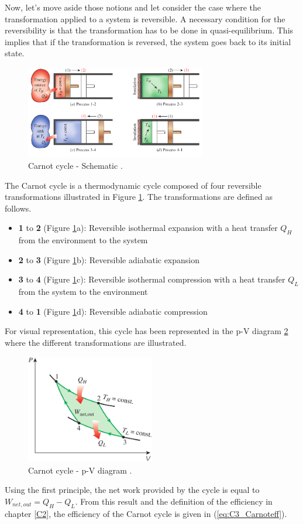 Now, let’s move aside those notions and let consider the case where the transformation applied to a system is reversible. A necessary condition for the reversibility is that the transformation has to be done in quasi-equilibrium. This implies that if the transformation is reversed, the system goes back to its initial state.

\begin{figure}[h]
\centering
\includegraphics[width=0.7\textwidth]{Carnot_schema.png}
\caption{Carnot cycle - Schematic \cite{2015}.}
\label{fig:C3_Carnot}
\end{figure}

The Carnot cycle is a thermodynamic cycle composed of four reversible transformations illustrated in Figure \ref{fig:C3_Carnot}. The transformations are defined as follows.

\begin{itemize}
\item \textbf{1} to \textbf{2} (Figure \ref{fig:C3_Carnot}a): Reversible isothermal expansion with a heat transfer $Q_H$ from the environment to the system
\item \textbf{2} to \textbf{3} (Figure \ref{fig:C3_Carnot}b): Reversible  adiabatic expansion
\item \textbf{3} to \textbf{4} (Figure \ref{fig:C3_Carnot}c): Reversible isothermal compression with a heat transfer $Q_L$ from the system to the environment
\item \textbf{4} to \textbf{1} (Figure \ref{fig:C3_Carnot}d): Reversible adiabatic compression
\end{itemize}
For visual representation, this cycle has been represented in the p-V diagram \ref{fig:C3_CarnotPV} where the different transformations are illustrated.
\begin{figure}[h]
\centering
\includegraphics[width=0.5\textwidth]{Carnot_PV.png}
\caption{Carnot cycle - p-V diagram \cite{2015}.}
\label{fig:C3_CarnotPV}
\end{figure}
Using the first principle, the net work provided by the cycle is equal to $W_{net,out}=Q_H-Q_L$. From this result and the definition of the efficiency in chapter \ref{C2}, the efficiency of the Carnot cycle is given in (\ref{eq:C3_Carnoteff}).

